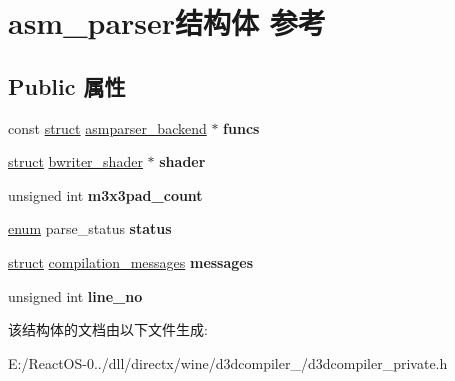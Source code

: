 \hypertarget{structasm__parser}{}\section{asm\+\_\+parser结构体 参考}
\label{structasm__parser}
\subsection*{Public 属性}
\begin{DoxyCompactItemize}
\item 
\mbox{\label{structasm__parser_afe05f543d80027a76bdd71882f7c40d5}} 
const \hyperlink{interfacestruct}{struct} \hyperlink{structasmparser__backend}{asmparser\+\_\+backend} $\ast$ {\bfseries funcs}
\item 
\mbox{\label{structasm__parser_a0397312defb6d3896086973167d3a50d}} 
\hyperlink{interfacestruct}{struct} \hyperlink{structbwriter__shader}{bwriter\+\_\+shader} $\ast$ {\bfseries shader}
\item 
\mbox{\label{structasm__parser_a5efbdb75d12863da672c89b128eabae0}} 
unsigned int {\bfseries m3x3pad\+\_\+count}
\item 
\mbox{\label{structasm__parser_aa0c69dc00a1fbc16833687815b5a900d}} 
\hyperlink{interfaceenum}{enum} parse\+\_\+status {\bfseries status}
\item 
\mbox{\label{structasm__parser_ac64eb585e8b12718de3d2d42d6779d79}} 
\hyperlink{interfacestruct}{struct} \hyperlink{structcompilation__messages}{compilation\+\_\+messages} {\bfseries messages}
\item 
\mbox{\label{structasm__parser_ae3cc0c197f9fdcecb26a74912840c2d5}} 
unsigned int {\bfseries line\+\_\+no}
\end{DoxyCompactItemize}


该结构体的文档由以下文件生成\+:\begin{DoxyCompactItemize}
\item 
E\+:/\+React\+O\+S-\/0../dll/directx/wine/d3dcompiler\+\_/d3dcompiler\+\_\+private.\+h\end{DoxyCompactItemize}
